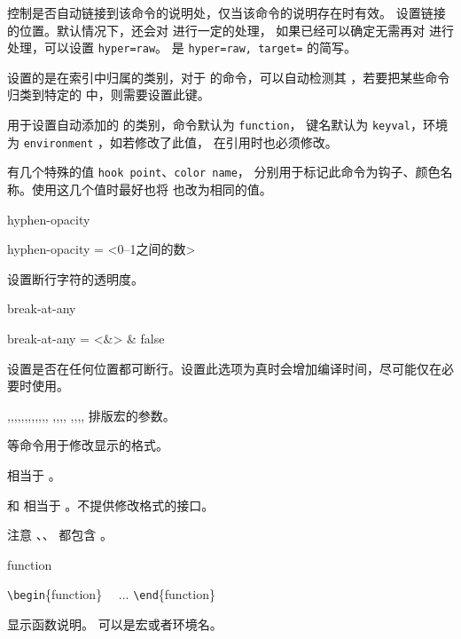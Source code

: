 \documentclass[twoside]{book}
\begin{document}
 控制是否自动链接到该命令的说明处，仅当该命令的说明存在时有效。
 设置链接的位置。默认情况下，还会对  进行一定的处理，
如果已经可以确定无需再对  进行处理，可以设置 \verb|hyper=raw|。
 是 \verb|hyper=raw, target=| 的简写。

 设置的是在索引中归属的类别，对于 \LaTeXiii 的命令，可以自动检测其 
，若要把某些命令归类到特定的  中，则需要设置此键。

 用于设置自动添加的  的类别，命令默认为 \texttt{function}，
键名默认为 \texttt{keyval}，环境为 \texttt{environment} ，如若修改了此值，
在引用时也必须修改。

 有几个特殊的值 \verb*|hook point|、\verb*|color name|，
分别用于标记此命令为钩子、颜色名称。使用这几个值时最好也将  也改为相同的值。

\begin{keyval}[path=doc/cmd]{hyphen-opacity}
  \begin{syntax}
    hyphen-opacity = <{0--1之间的数}>
  \end{syntax}
设置断行字符的透明度。
\end{keyval}

\begin{keyval}[path=doc/cmd]{break-at-any}
  \begin{syntax}
    break-at-any = <&\TTF> & false 
  \end{syntax}
设置是否在任何位置都可断行。设置此选项为真时会增加编译时间，尽可能仅在必要时使用。
\end{keyval}

\begin{function}{\meta,\veta,\marg,\Arg,\oarg,\parg,\pkg,\env,\cls,\opt,\file,\docfile,
  \whu@doc@meta@format,\whu@doc@veta@format,\whu@doc@marg@format,\whu@doc@oarg@format,
  \whu@doc@parg@format,\whu@doc@pkg@format,\whu@doc@env@format,\whu@doc@cls@format,\whu@doc@opt@format} 
排版宏的参数。

 等命令用于修改显示的格式。

 相当于 。

 和  相当于 。不提供修改格式的接口。

注意 、、 都包含 。
\end{function}

\begin{function}[type=environment]{function}
\begin{syntax}
  \verb|\begin|\{function\}  
  ~~... 
  \verb|\end|\{function\}
\end{syntax}
显示函数说明。 可以是宏或者环境名。
\end{function}
\end{document}
